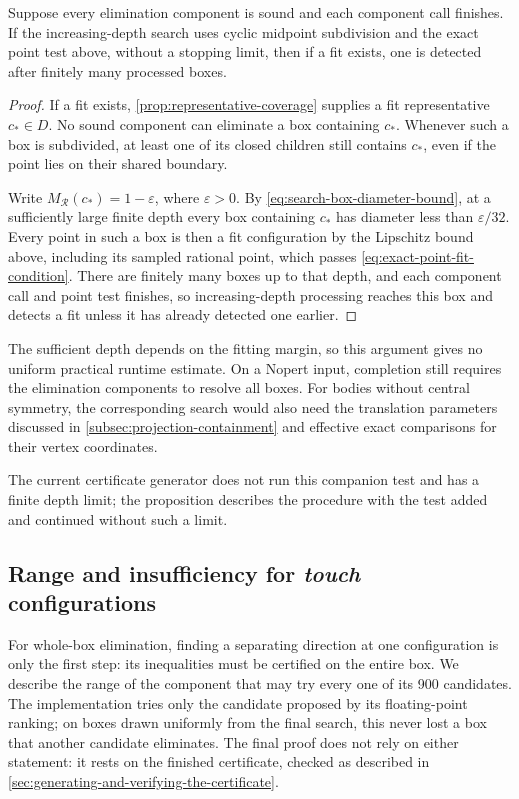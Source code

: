 \begin{proposition}\label{prop:finite-detection-of-fit}
  Suppose every elimination component is sound and each component call
  finishes. If the increasing-depth search uses cyclic midpoint subdivision
  and the exact point test above, without a stopping limit, then if a
  fit exists, one is detected after finitely many processed boxes.
\end{proposition}
\begin{proof}
  If a fit exists, \cref{prop:representative-coverage} supplies a fit
  representative $c_*\in D$. No sound component can eliminate a box
  containing $c_*$. Whenever such a box is subdivided, at least one of
  its closed children still contains $c_*$, even if the point lies on
  their shared boundary.

  Write $M_{\mathcal R}(c_*)=1-\varepsilon$, where $\varepsilon>0$.
  By \cref{eq:search-box-diameter-bound}, at a sufficiently large finite
  depth every box containing $c_*$ has diameter less than
  $\varepsilon/32$. Every point in such a box is then a fit configuration
  by the Lipschitz bound above, including its sampled rational point,
  which passes \cref{eq:exact-point-fit-condition}.
  There are finitely many boxes up to that depth, and each component call
  and point test finishes, so increasing-depth processing reaches this
  box and detects a fit unless it has already detected one earlier.
\end{proof}

The sufficient depth depends on the fitting margin, so this argument gives
no uniform practical runtime estimate. On a Nopert input, completion still
requires the elimination components to resolve all boxes.
For bodies without central symmetry, the corresponding search would also
need the translation parameters discussed in
\cref{subsec:projection-containment} and effective exact comparisons for
their vertex coordinates.

The current certificate generator does not run this companion test and
has a finite depth limit; the proposition describes the procedure with
the test added and continued without such a limit.

\subsection{Range and insufficiency for \emph{touch} configurations}\label{subsec:range-and-insufficiency-for-touch-configurations}

For whole-box elimination, finding a separating direction at one
configuration is only the first step: its inequalities must be certified
on the entire box. We describe the range of the component that may try
every one of its 900 candidates. The implementation tries only the
candidate proposed by its floating-point ranking; on boxes drawn uniformly
from the final search, this never lost a box that another candidate
eliminates. The final proof does not rely on either statement: it rests on
the finished certificate, checked as described in
\cref{sec:generating-and-verifying-the-certificate}.


